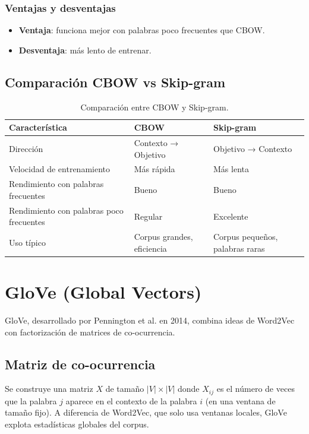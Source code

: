 \documentclass[12pt,a4paper,openany,oneside]{book}
\begin{document}
\subsubsection{Ventajas y desventajas}
\begin{itemize}
    \item \textbf{Ventaja}: funciona mejor con palabras poco frecuentes que CBOW.
    \item \textbf{Desventaja}: más lento de entrenar.
\end{itemize}

\subsection{Comparación CBOW vs Skip-gram}
\begin{table}[h]
\centering
\begin{tabular}{|l|l|l|}
\hline
\textbf{Característica} & \textbf{CBOW} & \textbf{Skip-gram} \\
\hline
Dirección & Contexto → Objetivo & Objetivo → Contexto \\
Velocidad de entrenamiento & Más rápida & Más lenta \\
Rendimiento con palabras frecuentes & Bueno & Bueno \\
Rendimiento con palabras poco frecuentes & Regular & Excelente \\
Uso típico & Corpus grandes, eficiencia & Corpus pequeños, palabras raras \\
\hline
\end{tabular}
\caption{Comparación entre CBOW y Skip-gram.}
\end{table}

\section{GloVe (Global Vectors)}

GloVe, desarrollado por Pennington et al. en 2014, combina ideas de Word2Vec con factorización de matrices de co-ocurrencia.

\subsection{Matriz de co-ocurrencia}
Se construye una matriz \(X\) de tamaño \(|V| \times |V|\) donde \(X_{ij}\) es el número de veces que la palabra \(j\) aparece en el contexto de la palabra \(i\) (en una ventana de tamaño fijo). A diferencia de Word2Vec, que solo usa ventanas locales, GloVe explota estadísticas globales del corpus.
\end{document}
